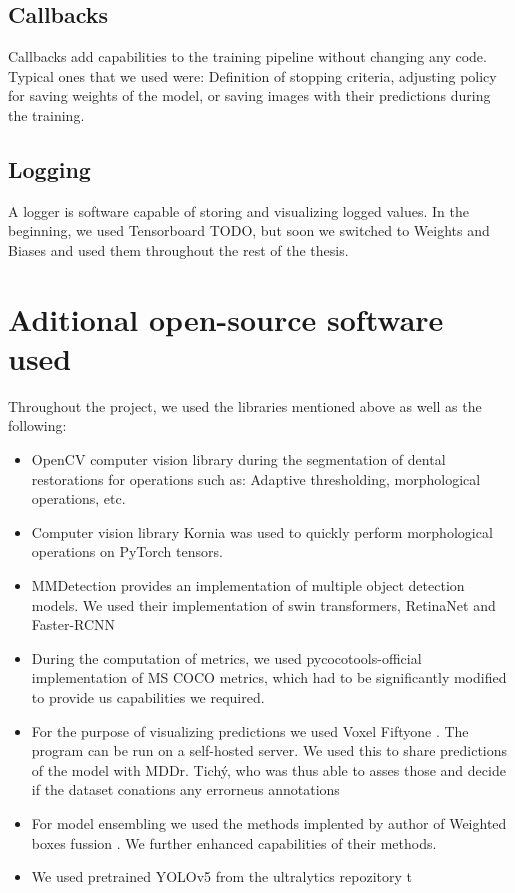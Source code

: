 \subsection{Callbacks}
Callbacks add capabilities to the training pipeline without changing any code. Typical ones that we used were: Definition of stopping criteria, adjusting policy for saving weights of the model, or saving images with their predictions during the training.

\subsection{Logging}
A logger is software capable of storing and visualizing logged values. In the beginning, we used Tensorboard TODO, but soon we switched to Weights and Biases \cite{wandb} and used them throughout the rest of the thesis.

\section{Aditional open-source software used}
Throughout the project, we used the libraries mentioned above as well as the following:
\begin{itemize}
    \item OpenCV \cite{opencv_library}  computer vision library during the segmentation of dental restorations for operations such as: Adaptive thresholding, morphological operations, etc.
    \item Computer vision library Kornia \cite{eriba2019kornia} was used to quickly perform morphological operations on PyTorch tensors.
    \item MMDetection \cite{mmdetection} provides an implementation of multiple object detection models. We used their implementation of swin transformers, RetinaNet and Faster-RCNN
    \item During the computation of metrics, we used pycocotools-official \cite{pycocotools} implementation of MS COCO metrics, which had to be significantly modified to provide us capabilities we required.
    \item For the purpose of visualizing predictions we used Voxel Fiftyone \cite{moorefiftyone}. The program can be run on a self-hosted server. We used this to share predictions of the model with MDDr. Tichý, who was thus able to asses those and decide if the dataset conations any errorneus annotations
    \item For model ensembling we used the methods implented by author of Weighted boxes fussion \cite{Solovyev2019}. We further enhanced capabilities of their methods.
    \item We used pretrained YOLOv5 from the ultralytics repozitory \cite{glennjocher2020}
          t\end{itemize}